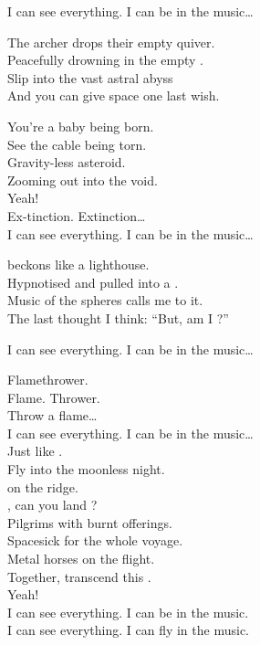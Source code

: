 I can see everything. I can be in the music… \\


The archer drops their empty quiver. \\
Peacefully drowning in the empty . \\
Slip into the vast astral abyss \\
And you can give space one last wish. \\


You're a baby being born. \\
See the cable being torn. \\
Gravity-less asteroid. \\
Zooming out into the void. \\
Yeah! \\

Ex-tinction. Extinction… \\

I can see everything. I can be in the music… \\


 beckons like a lighthouse. \\
Hypnotised and pulled into a . \\
Music of the spheres calls me to it. \\
The last thought I think: ``But, am I ?'' \\


I can see everything. I can be in the music… \\


Flamethrower. \\
Flame. Thrower. \\
Throw a flame… \\

I can see everything. I can be in the music… \\

Just like . \\
Fly into the moonless night. \\
 on the ridge. \\
, can you land ? \\
Pilgrims with burnt offerings. \\
Spacesick for the whole voyage. \\
Metal horses on the flight. \\
Together, transcend this . \\
Yeah! \\

I can see everything. I can be in the music. \\
I can see everything. I can fly in the music. \\
